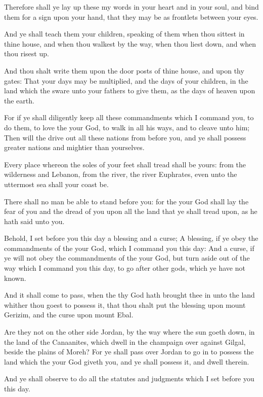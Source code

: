 \Verse Therefore shall ye lay up these my words in your heart and in your soul, and bind them for a sign upon your hand, that they may be as frontlets between your eyes.

\Verse And ye shall teach them your children, speaking of them when thou sittest in thine house, and when thou walkest by the way, when thou liest down, and when thou risest up.

\Verse And thou shalt write them upon the door posts of thine house, and upon thy gates: \Verse That your days may be multiplied, and the days of your children, in the land which the \LORD sware unto your fathers to give them, as the days of heaven upon the earth.

\Verse For if ye shall diligently keep all these commandments which I command you, to do them, to love the \LORD your God, to walk in all his ways, and to cleave unto him; \Verse Then will the \LORD drive out all these nations from before you, and ye shall possess greater nations and mightier than yourselves.

\Verse Every place whereon the soles of your feet shall tread shall be yours: from the wilderness and Lebanon, from the river, the river Euphrates, even unto the uttermost sea shall your coast be.

\Verse There shall no man be able to stand before you: for the \LORD your God shall lay the fear of you and the dread of you upon all the land that ye shall tread upon, as he hath said unto you.

\Verse Behold, I set before you this day a blessing and a curse; \Verse A blessing, if ye obey the commandments of the \LORD your God, which I command you this day: \Verse And a curse, if ye will not obey the commandments of the \LORD your God, but turn aside out of the way which I command you this day, to go after other gods, which ye have not known.

\Verse And it shall come to pass, when the \LORD thy God hath brought thee in unto the land whither thou goest to possess it, that thou shalt put the blessing upon mount Gerizim, and the curse upon mount Ebal.

\Verse Are they not on the other side Jordan, by the way where the sun goeth down, in the land of the Canaanites, which dwell in the champaign over against Gilgal, beside the plains of Moreh?  \Verse For ye shall pass over Jordan to go in to possess the land which the \LORD your God giveth you, and ye shall possess it, and dwell therein.

\Verse And ye shall observe to do all the statutes and judgments which I set before you this day.


